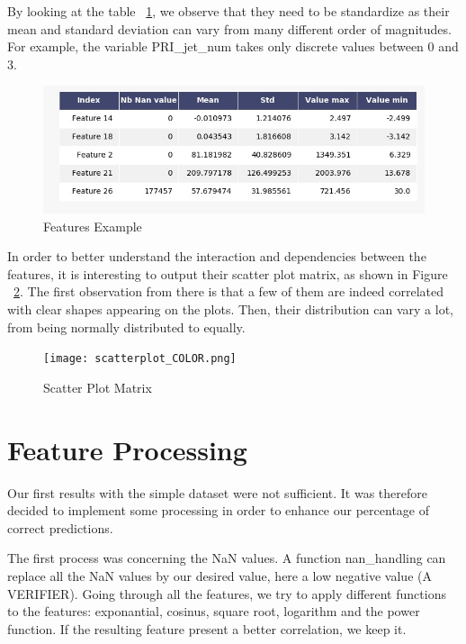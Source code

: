 \documentclass[10pt,conference,compsocconf]{IEEEtran}
\begin{document}
By looking at the table ~\ref{fig:features}, we observe that they need to be standardize as their mean and standard deviation can vary from many different order of magnitudes. For example, the variable PRI\_jet\_num  takes only discrete values between 0 and 3.

\begin{figure}[hbp]
  \centering
  \includegraphics[width=\columnwidth]{features.png}
  \caption{Features Example}
  \vspace{-3mm}
  \label{fig:features}
\end{figure}

In order to better understand the interaction and dependencies between the features, it is interesting to output their scatter plot matrix, as shown in Figure ~\ref{fig:scatterplot}. The first observation from there is that a few of them are indeed correlated with clear shapes appearing on the plots. Then, their distribution can vary a lot, from being normally distributed to equally.

\begin{figure}[hbp]
  \centering
  \texttt{[image: scatterplot\_COLOR.png]}
  \caption{Scatter Plot Matrix}
  \vspace{-3mm}
  \label{fig:scatterplot}
\end{figure}

\section{Feature Processing}

Our first results with the simple dataset were not sufficient. It was therefore decided to implement some processing in order to enhance our percentage of correct predictions. 

The first process was concerning the NaN values. A function nan\_handling can replace all the NaN values by our desired value, here a low negative value (A VERIFIER). Going through all the features, we try to apply different functions to the features: exponantial, cosinus, square root, logarithm and the power function. If the resulting feature present a better correlation, we keep it. 
\end{document}
